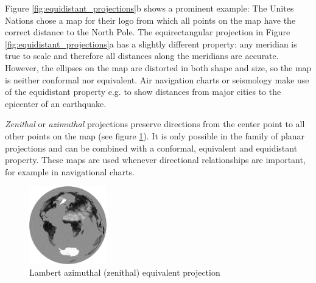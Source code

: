 \addtocounter{footnote}{1} %

Figure \ref{fig:equidistant_projections}b shows a prominent example: The Unites Nations chose a map for their logo from which all points on the map have the correct distance to the North Pole. The equirectangular projection in Figure \ref{fig:equidistant_projections}a has a slightly different property: any meridian is true to scale and therefore all distances along the meridians are accurate. However, the ellipses on the map are distorted in both shape and size, so the map is neither conformal nor equivalent. Air navigation charts or seismology make use of the equidistant property e.g. to show distances from major cities to the epicenter of an earthquake.
\cite{mapProjectionGeokov}

\emph{Zenithal} or \emph{azimuthal} projections preserve directions from the center point to all other points on the map (see figure \ref{fig:zenithal_projection}). It is only possible in the family of planar projections and can be combined with a conformal, equivalent and equidistant property. These maps are used whenever directional relationships are important, for example in navigational charts.

\begin{figure}[ht]
  \centering
  \includegraphics[width=0.3\textwidth]{graphics/basics/projection_distortion_azimuthal.png}
  \caption{Lambert azimuthal (zenithal) equivalent projection \protect\footnotemark}
  \label{fig:zenithal_projection}
\end{figure}


